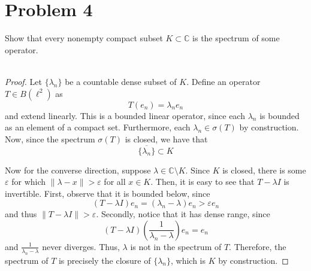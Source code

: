 \documentclass[fontsize=11pt]{scrartcl} %
\numberwithin{equation}{section} %
\numberwithin{figure}{section} %
\numberwithin{table}{section} %
\newcommand{\C}{\mathbb{C}}
\begin{document}
\section*{Problem 4}
Show that every nonempty compact subset $K\subset\C$ is the spectrum of some
operator.
\\
\\
\begin{proof}
    Let $\{\lambda_n\}$ be a countable dense subset of $K$. Define an operator
    $T\in B(\ell^2)$ as
    \[
        T(e_n) = \lambda_ne_n
    \]
    and extend linearly. This is a bounded linear operator, since each
    $\lambda_n$ is bounded as an element of a compact set. Furthermore, each
    $\lambda_n\in\sigma(T)$ by construction. Now, since the spectrum $\sigma(T)$
    is closed, we have that
    \[
        \overline{\{\lambda_n\}} \subset K
    \]

    Now for the converse direction, suppose $\lambda\in \C\setminus K$. Since
    $K$ is closed, there is some $\varepsilon$ for which $\|\lambda - x\| >
    \varepsilon$ for all $x\in K$. Then, it is easy to see that $T-\lambda I$ is
    invertible. First, observe that it is bounded below, since
    \[
        (T-\lambda I)e_n = (\lambda_n-\lambda)e_n > \varepsilon e_n
    \]
    and thus $\|T-\lambda I\| > \varepsilon$. Secondly, notice that it has dense
    range, since
    \[
        (T-\lambda I)(\frac{1}{\lambda_n-\lambda})e_n = e_n
    \]
    and $\frac{1}{\lambda_n - \lambda}$ never diverges. Thus, $\lambda$ is not
    in the spectrum of $T$. Therefore, the spectrum of $T$ is precisely the
    closure of $\{\lambda_n\}$, which is $K$ by construction.
\end{proof}

\newpage
\end{document}
